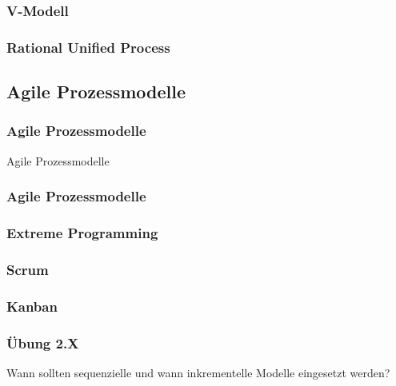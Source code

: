 \begin{frame}
\frametitle{V-Modell}
	
\end{frame}

\begin{frame}
\frametitle{Rational Unified Process}
	
\end{frame}

\subsection{Agile Prozessmodelle}
\begin{frame}
\frametitle{Agile Prozessmodelle}
\huge Agile Prozessmodelle
\end{frame}

\begin{frame}
\frametitle{Agile Prozessmodelle}

\end{frame}

\begin{frame}
\frametitle{Extreme Programming}
	
\end{frame}

\begin{frame}
\frametitle{Scrum}
	
\end{frame}

\begin{frame}
\frametitle{Kanban}
	
\end{frame}

\begin{frame}
\frametitle{Übung 2.X}
	Wann sollten sequenzielle und wann inkrementelle Modelle eingesetzt werden?
\end{frame}
